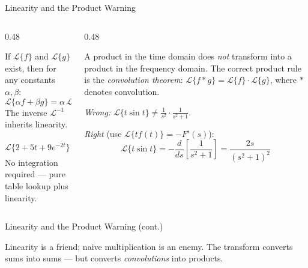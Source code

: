 \documentclass[aspectratio=169,11pt]{beamer}
\begin{document}
\begin{frame}{Linearity and the Product Warning}
\footnotesize
\begin{columns}[T]
\begin{column}{0.48\textwidth}
\begin{formulabox}
If $\mathcal{L}\{f\}$ and $\mathcal{L}\{g\}$ exist, then for any constants $\alpha, \beta$:
\[\mathcal{L}\{\alpha f + \beta g\} = \alpha\,\mathcal{L}\{f\} + \beta\,\mathcal{L}\{g\}\]
The inverse $\mathcal{L}^{-1}$ inherits linearity.
\end{formulabox}
\vspace{0.5mm}
\begin{examplebox}
\[\mathcal{L}\{2 + 5t + 9e^{-2t}\} = \frac{2}{s} + \frac{5}{s^2} + \frac{9}{s+2}\]
No integration required --- pure table lookup plus linearity.
\end{examplebox}
\end{column}
\begin{column}{0.48\textwidth}
\begin{warningbox}
A product in the time domain does \emph{not} transform into a product in the frequency domain. The correct product rule is the \emph{convolution theorem}: $\mathcal{L}\{f * g\} = \mathcal{L}\{f\}\cdot\mathcal{L}\{g\}$, where $*$ denotes convolution.
\end{warningbox}
\vspace{0.5mm}
\begin{examplebox}
\emph{Wrong:} $\mathcal{L}\{t\sin t\} \ne \frac{1}{s^2}\cdot\frac{1}{s^2+1}$.

\emph{Right} (use $\mathcal{L}\{t f(t)\} = -F'(s)$):
\[\mathcal{L}\{t\sin t\} = -\frac{d}{ds}\!\left[\frac{1}{s^2+1}\right] = \frac{2s}{(s^2+1)^2}\]
\end{examplebox}
\end{column}
\end{columns}
\end{frame}

\begin{frame}{Linearity and the Product Warning (cont.)}
\footnotesize
\begin{conceptbox}
Linearity is a friend; naive multiplication is an enemy. The transform converts sums into sums --- but converts \emph{convolutions} into products.
\end{conceptbox}
\end{frame}
\end{document}
